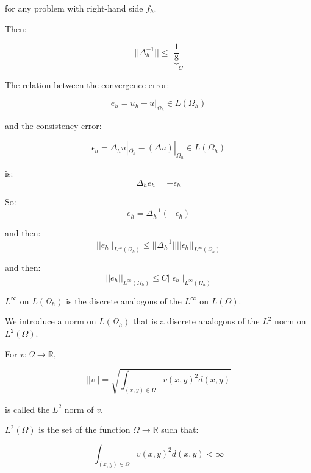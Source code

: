 for any problem with right-hand side $f_h$.

Then:

\begin{equation*}
|| \Delta_h^{-1} || \le \underbrace{\frac{1}{8}}_{= C}
\end{equation*}

The relation between the convergence error:

\begin{equation*}
e_h = u_h - {u|}_{\Omega_h} \in L(\Omega_h)
\end{equation*}

and the consistency error:

\begin{equation*}
\epsilon_h = \Delta_h u|_{\overline{\Omega_h}} - (\Delta u)|_{\Omega_h} \in L(\Omega_h)
\end{equation*}

is:
\begin{equation*}
\Delta_h e_h = - \epsilon_h
\end{equation*}

So:
\begin{equation*}
e_h = \Delta_h^{-1}(-\epsilon_h)
\end{equation*}

and then:
\begin{equation*}
||e_h||_{L^{\infty}(\Omega_h)} \le || \Delta_h^{-1} || {|| \epsilon_h ||}_{L^\infty(\Omega_h)}
\end{equation*}

and then:
\begin{equation*}
||e_h||_{L^{\infty}(\Omega_h)} \le C {|| \epsilon_h ||}_{L^\infty(\Omega_h)}
\end{equation*}

$L^\infty$ on $L(\Omega_h)$ is the discrete analogous of the $L^\infty$ on $L(\Omega)$.

We introduce a norm on $L(\Omega_h)$ that is a discrete analogous of the $L^2$ norm on $L^2(\Omega)$.

For $v: \Omega \rightarrow \mathbb{R}$,

\begin{equation*}
|| v || = \sqrt{\int_{(x, y) \in \Omega} v(x,y)^2 d(x, y)}
\end{equation*}

is called the $L^2$ norm of $v$.

$L^2(\Omega)$ is the set of the function $\Omega \rightarrow \mathbb{R}$ such that:

\begin{equation*}
\int_{(x, y) \in \Omega} v(x,y)^2 d(x, y) < \infty
\end{equation*}

